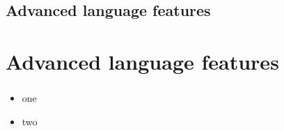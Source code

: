 
\section{Advanced language features}
\chapter{Advanced language features}
\subsection{} %

\begin{frame}{}
  \begin{itemize}\setlength{\itemsep}{3mm}
    \item one
    \item two
  \end{itemize}
\end{frame}

